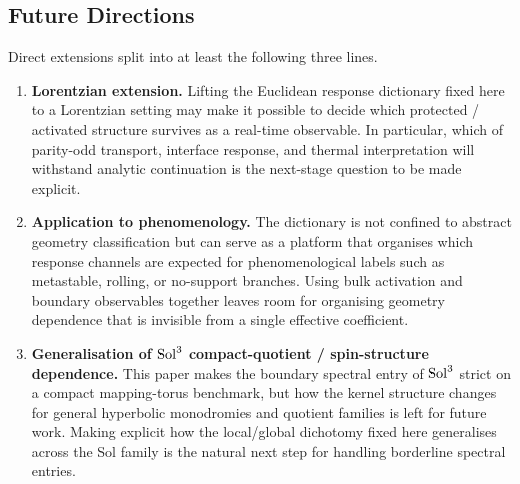\subsection{Future Directions}
\label{sec:discussion:future}

Direct extensions split into at least the following three lines.

\begin{enumerate}
  \item \textbf{Lorentzian extension.}  Lifting the Euclidean response
        dictionary fixed here to a Lorentzian setting may make it possible
        to decide which protected / activated structure survives as a
        real-time observable.  In particular, which of parity-odd transport,
        interface response, and thermal interpretation will withstand
        analytic continuation is the next-stage question to be made
        explicit.

  \item \textbf{Application to phenomenology.}  The dictionary is not
        confined to abstract geometry classification but can serve as a
        platform that organises which response channels are expected for
        phenomenological labels such as metastable, rolling, or no-support
        branches.  Using bulk activation and boundary observables together
        leaves room for organising geometry dependence that is invisible
        from a single effective coefficient.

  \item \textbf{Generalisation of $\mathrm{Sol}^3$ compact-quotient / spin-structure
        dependence.}  This paper makes the boundary spectral entry of
        $\mathrm{Sol}^3$ strict on a compact mapping-torus benchmark, but how
        the kernel structure changes for general hyperbolic monodromies and
        quotient families is left for future work.  Making explicit how the
        local/global dichotomy fixed here generalises across the Sol family
        is the natural next step for handling borderline spectral entries.
\end{enumerate}
